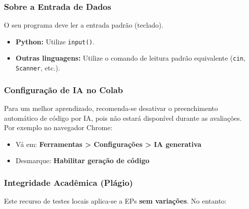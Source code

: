 \documentclass[
  portuguese,
  letterpaper,
  openany,
  oneside,
  12pt,
  a4paper]{book}
\providecommand{\tightlist}{%
  \setlength{\itemsep}{0pt}\setlength{\parskip}{0pt}}
\begin{document}
\subsubsection*{\texorpdfstring{ Sobre a
Entrada de
Dados}{ Sobre a Entrada de Dados}}\label{sobre-a-entrada-de-dados}

O seu programa deve ler a entrada padrão (teclado).

\begin{itemize}
\tightlist
\item
  \textbf{Python:} Utilize \texttt{input()}.
\item
  \textbf{Outras linguagens:} Utilize o comando de leitura padrão
  equivalente (\texttt{cin}, \texttt{Scanner}, etc.).
\end{itemize}

\subsubsection*{\texorpdfstring{ Configuração
de IA no
Colab}{ Configuração de IA no Colab}}\label{configurauxe7uxe3o-de-ia-no-colab}

Para um melhor aprendizado, recomenda-se desativar o preenchimento
automático de código por IA, pois não estará disponível durante as
avaliações. Por exemplo no navegador Chrome:

\begin{itemize}
\tightlist
\item
  Vá em: \textbf{Ferramentas \textgreater{} Configurações \textgreater{}
  IA generativa}
\item
  Desmarque: \textbf{Habilitar geração de código}
\end{itemize}

\subsubsection*{\texorpdfstring{ Integridade
Acadêmica
(Plágio)}{ Integridade Acadêmica (Plágio)}}\label{integridade-acaduxeamica-pluxe1gio}

Este recurso de testes locais aplica-se a EPs \textbf{sem variações}. No
entanto:
\end{document}
